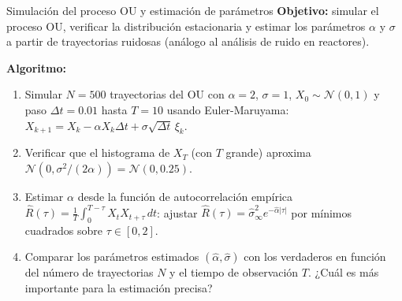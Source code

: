 \begin{ejerciciocomp}{Simulación del proceso OU y estimación de parámetros}
\textbf{Objetivo:} simular el proceso OU, verificar la distribución estacionaria
y estimar los parámetros $\alpha$ y $\sigma$ a partir de trayectorias ruidosas
(análogo al análisis de ruido en reactores).

\medskip\noindent\textbf{Algoritmo:}
\begin{enumerate}
  \item Simular $N = 500$ trayectorias del OU con $\alpha = 2$, $\sigma = 1$,
        $X_0 \sim \mathcal{N}(0,1)$ y paso $\Delta t = 0.01$ hasta $T = 10$
        usando Euler-Maruyama: $X_{k+1} = X_k - \alpha X_k\Delta t +
        \sigma\sqrt{\Delta t}\,\xi_k$.
  \item Verificar que el histograma de $X_T$ (con $T$ grande) aproxima
        $\mathcal{N}(0, \sigma^2/(2\alpha)) = \mathcal{N}(0, 0.25)$.
  \item Estimar $\alpha$ desde la función de autocorrelación empírica
        $\hat{R}(\tau) = \frac{1}{T}\int_0^{T-\tau}X_t X_{t+\tau}\,dt$:
        ajustar $\hat{R}(\tau) = \hat{\sigma}^2_\infty e^{-\hat{\alpha}|\tau|}$
        por mínimos cuadrados sobre $\tau \in [0, 2]$.
  \item Comparar los parámetros estimados $(\hat{\alpha}, \hat{\sigma})$ con
        los verdaderos en función del número de trayectorias $N$ y el tiempo
        de observación $T$. ¿Cuál es más importante para la estimación precisa?
\end{enumerate}
\end{ejerciciocomp}

